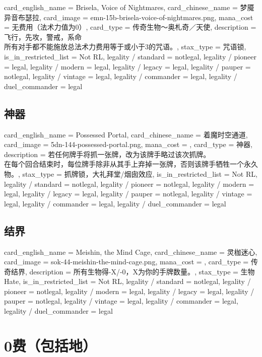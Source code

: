 \documentclass[lang = cn, color = black, 10pt]{AllThatStax}
\begin{document}
\card
{
	card_english_name = {Brisela, Voice of Nightmares},
	card_chinese_name = {梦魇异音布瑟拉},
	card_image = emn-15b-brisela-voice-of-nightmares.png,
	mana_cost = 无费用（法术力值为0）,
	card_type = 传奇生物～奥札奇／天使,
	description = {飞行，先攻，警戒，系命\\
所有对手都不能施放总法术力费用等于或小于3的咒语。},
	stax_type = 咒语锁,
	is_in_restricted_list = Not RL,
	legality / standard = notlegal,
	legality / pioneer = legal,
	legality / modern = legal,
	legality / legacy = legal,
	legality / pauper = notlegal,
	legality / vintage = legal,
	legality / commander = legal,
	legality / duel_commander = legal
}

\section{神器}

\card
{
	card_english_name = {Possessed Portal},
	card_chinese_name = {着魔时空通道},
	card_image = 5dn-144-possessed-portal.png,
	mana_cost = ,
	card_type = 神器,
	description = {若任何牌手将抓一张牌，改为该牌手略过该次抓牌。\\
在每个回合结束时，每位牌手除非从其手上弃掉一张牌，否则该牌手牺牲一个永久物。},
	stax_type = 抓牌锁，大礼拜堂/烟囱效应,
	is_in_restricted_list = Not RL,
	legality / standard = notlegal,
	legality / pioneer = notlegal,
	legality / modern = legal,
	legality / legacy = legal,
	legality / pauper = notlegal,
	legality / vintage = legal,
	legality / commander = legal,
	legality / duel_commander = legal
}

\section{结界}

\card
{
	card_english_name = {Meishin, the Mind Cage},
	card_chinese_name = {灵枷迷心},
	card_image = sok-44-meishin-the-mind-cage.png,
	mana_cost = ,
	card_type = 传奇结界,
	description = {所有生物得-X/-0，X为你的手牌数量。},
	stax_type = 生物Hate,
	is_in_restricted_list = Not RL,
	legality / standard = notlegal,
	legality / pioneer = notlegal,
	legality / modern = legal,
	legality / legacy = legal,
	legality / pauper = notlegal,
	legality / vintage = legal,
	legality / commander = legal,
	legality / duel_commander = legal
}

\chapter{0费（包括地）}
\end{document}
